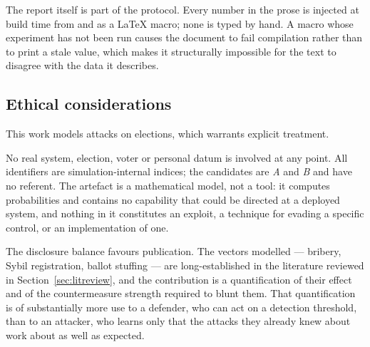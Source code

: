 The report itself is part of the protocol. Every number in the prose is
injected at build time from  and
 as a \LaTeX{} macro; none is typed by hand. A macro
whose experiment has not been run causes the document to fail
compilation rather than to print a stale value, which makes it
structurally impossible for the text to disagree with the data it
describes.

\subsection{Ethical considerations}

This work models attacks on elections, which warrants explicit
treatment.

No real system, election, voter or personal datum is involved at any
point. All identifiers are simulation-internal indices; the candidates
are \emph{A} and \emph{B} and have no referent. The artefact is a
mathematical model, not a tool: it computes probabilities and contains
no capability that could be directed at a deployed system, and nothing
in it constitutes an exploit, a technique for evading a specific
control, or an implementation of one.

The disclosure balance favours publication. The vectors modelled ---
bribery, Sybil registration, ballot stuffing --- are long-established
in the literature reviewed in Section~\ref{sec:litreview}, and the
contribution is a quantification of their effect and of the
countermeasure strength required to blunt them. That quantification is
of substantially more use to a defender, who can act on a detection
threshold, than to an attacker, who learns only that the attacks they
already knew about work about as well as expected.

